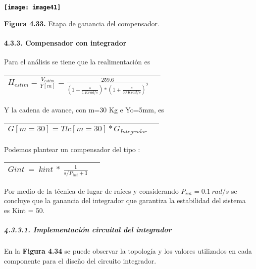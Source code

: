 \documentclass{article} %
\begin{document}
\noindent \textbf{\texttt{[image: image41]}}

\noindent \textbf{Figura 4.33. }Etapa de ganancia del compensador.

\noindent 
\paragraph{4.3.3. Compensador con integrador}

\noindent 

\noindent Para el an\'{a}lisis se tiene que la realimentaci\'{o}n es 

\begin{tabular}{|p{3.9in}|p{0.4in}|} \hline 
$H_{estim}=\frac{V_{estim}}{Y[m]}=\frac{259.6}{(1+\frac{s}{1\ Krad/s})*{(1+\frac{s}{60\ Krad/s})}^2}$ &  \\ \hline 
\end{tabular}

 

\noindent Y la cadena de avance, con m=30 Kg e Yo=5mm, es

\noindent 

\begin{tabular}{|p{3.9in}|p{0.4in}|} \hline 
$G[m=30]=Tlc[m=30]*G_{Integrador}$ &  \\ \hline 
\end{tabular}



\noindent Podemos plantear un compensador del tipo :

\noindent 

\begin{tabular}{|p{3.9in}|p{0.4in}|} \hline 
$Gint\ =\ kint\ *\ \frac{1}{s/P_{int}+1}$ &  \\ \hline 
\end{tabular}



\noindent Por medio de la t\'{e}cnica de lugar de ra\'{i}ces y considerando $P_{int}=0.1\ rad/s$ se concluye que la ganancia del integrador que garantiza la estabilidad del sistema es Kint = 50.

\noindent 

\noindent 
\subparagraph{4.3.3.1. Implementaci\'{o}n circuital del integrador}

\noindent En la\textbf{ Figura 4.34} se puede observar la topolog\'{i}a y los valores utilizados en cada componente para el dise\~{n}o del circuito integrador. 

\noindent 
\end{document}
